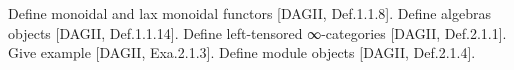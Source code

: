 \documentclass[a4paper]{amsart}
\numberwithin{figure}{section}
\theoremstyle{theorem}
\theoremstyle{definition}
\newcommand{\NN}{\mathbb{N}}
\newcommand{\Top}{{Top}}
\begin{document}
%
%
%
%
%
%




Define monoidal and lax monoidal functors [DAGII, Def.1.1.8]. %
Define algebras objects [DAGII, Def.1.1.14]. %
Define left-tensored ∞-categories [DAGII, Def.2.1.1]. %
Give example [DAGII, Exa.2.1.3]. %
Define module objects [DAGII, Def.2.1.4]. %
\end{document}
